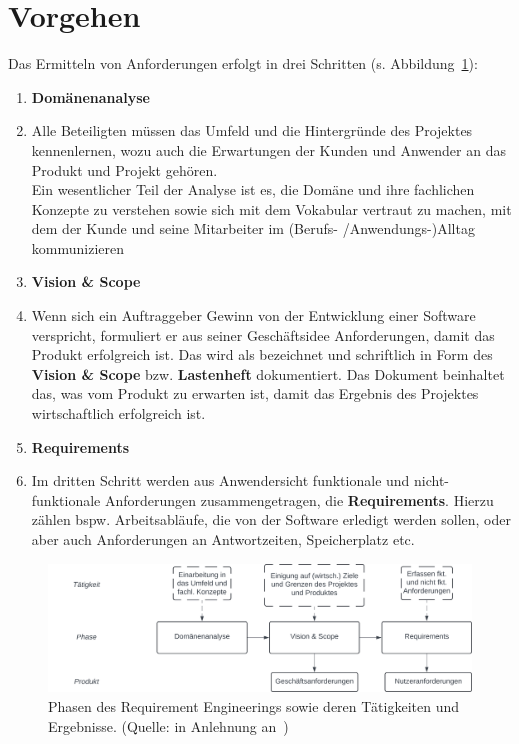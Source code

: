 \section{Vorgehen}

\noindent
Das Ermitteln von Anforderungen erfolgt in drei Schritten (s. Abbildung~\ref{fig:requirementsengineering}):

\begin{enumerate}
    \item \textbf{Domänenanalyse}
    \item[] Alle Beteiligten müssen das Umfeld und die Hintergründe des Projektes kennenlernen, wozu auch die Erwartungen
    der Kunden und Anwender an das Produkt und Projekt gehören.\\
    Ein wesentlicher Teil der Analyse ist es, die Domäne und ihre fachlichen Konzepte zu verstehen sowie sich mit dem Vokabular vertraut zu machen, mit dem der Kunde und seine Mitarbeiter im (Berufs- /Anwendungs-)Alltag kommunizieren
    \item \textbf{Vision \& Scope}
    \item[] Wenn sich ein Auftraggeber Gewinn von der Entwicklung einer Software verspricht, formuliert er aus seiner Geschäftsidee Anforderungen, damit das Produkt erfolgreich ist.
    Das wird als  bezeichnet und schriftlich in Form des \textbf{Vision \& Scope} bzw. \textbf{Lastenheft} dokumentiert.
    Das Dokument beinhaltet das, was vom Produkt zu erwarten ist, damit das Ergebnis des Projektes wirtschaftlich erfolgreich ist.
    \item \textbf{Requirements}
    \item[] Im dritten Schritt werden aus Anwendersicht funktionale und nicht-funktionale Anforderungen zusammengetragen, die \textbf{Requirements}.
    Hierzu zählen bspw. Arbeitsabläufe, die von der Software erledigt werden sollen, oder aber auch Anforderungen an Antwortzeiten, Speicherplatz etc.
\end{enumerate}



\begin{figure}
    \centering
    \includegraphics[scale=0.35]{chapters/Requirements Engineering/img/requirementsengineering}
    \caption{Phasen des Requirement Engineerings sowie deren Tätigkeiten und Ergebnisse. (Quelle: in Anlehnung an~\cite[84]{Wed09})}
    \label{fig:requirementsengineering}
\end{figure}

